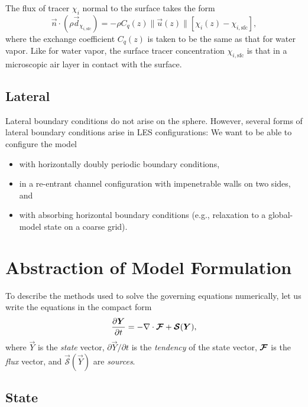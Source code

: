\documentclass{article}
\begin{document}
The flux of tracer $\chi_i$ normal to the surface takes the form 
\begin{equation}\label{e:sfc_tracer}
 \vec{n} \cdot (\rho \vec{d}_{\chi_{i, \mathrm{sfc}}}) = - \rho C_q(z) \| \vec{u}(z) \| \left[\chi_i(z) - \chi_{i, \mathrm{sfc}} \right],
\end{equation} 
where the exchange coefficient $C_q(z)$ is taken to be the same as that for water vapor. Like for water vapor, the surface tracer concentration $\chi_{i, \mathrm{sfc}}$ is that in a microscopic air layer in contact with the surface.

\subsection{Lateral}

Lateral boundary conditions do not arise on the sphere. However, several forms of lateral boundary conditions arise in LES configurations: We want to be able to configure the model
\begin{itemize}
    \item with horizontally doubly periodic boundary conditions,
    \item in a re-entrant channel configuration with impenetrable walls on two sides, and 
    \item with absorbing horizontal boundary conditions (e.g., relaxation to a global-model state on a coarse grid). 
\end{itemize}



\section{Abstraction of Model Formulation}\label{s:abstract_model_formulation}

To describe the methods used to solve the governing equations numerically, let us write the equations in the compact form 
\begin{equation}\label{e:eom_compact}
\frac{\partial \boldsymbol{{Y}}}{\partial t}  =  - \nabla \cdot \boldsymbol{{\mathcal{F}}} + \boldsymbol{{\mathcal{S}}}(\boldsymbol{{Y}}),
\end{equation}
where $\vec{Y}$ is the \emph{state} vector, $\partial\vec{Y}/\partial t$ is the \emph{tendency} of the state vector, $\boldsymbol{{\mathcal{F}}}$ is the \emph{flux} vector, and $\vec{\mathcal{S}}(\vec{Y})$ are \emph{sources}. 

\subsection{State}
\end{document}
